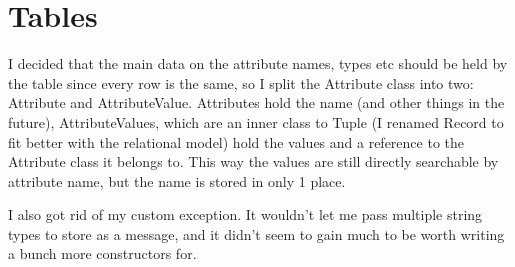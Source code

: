 \documentclass[11pt]{article} %
\begin{document}
\section{Tables}
I decided that the main data on the attribute names, types etc should be held by the table since every row is the same, so I split the Attribute class into two: Attribute and AttributeValue. Attributes hold the name (and other things in the future), AttributeValues, which are an inner class to Tuple (I renamed Record to fit better with the relational model) hold the values and a reference to the Attribute class it belongs to. This way the values are still directly searchable by attribute name, but the name is stored in only 1 place. 

I also got rid of my custom exception. It wouldn't let me pass multiple string types to store as a message, and it didn't seem to gain much to be worth writing a bunch more constructors for.
\end{document}
